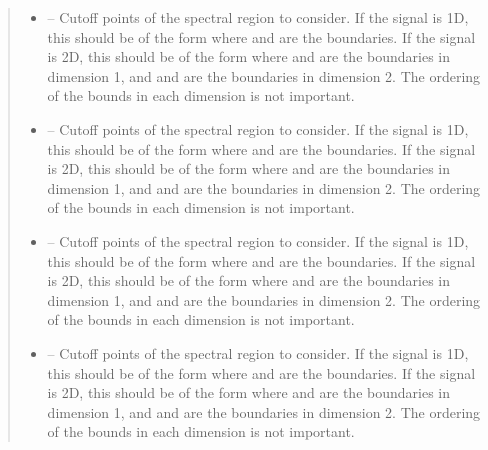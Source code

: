 \documentclass[letterpaper,10pt,english]{sphinxmanual}
\begin{document}
\begin{fulllineitems}
\begin{fulllineitems}
\begin{quote}
\begin{description}
\begin{itemize}
\item {} 
\sphinxAtStartPar
\sphinxstyleliteralstrong{\sphinxupquote{{[}}}\sphinxstyleliteralstrong{\sphinxupquote{{[}}} – Cut\sphinxhyphen{}off points of the spectral region to consider.
If the signal is 1D, this should be of the form \sphinxtitleref{{[}{[}a,b{]}{]}}
where  and  are the boundaries.
If the signal is 2D, this should be of the form
\sphinxtitleref{{[}{[}a,b{]}, {[}c,d{]}{]}} where  and  are the boundaries in
dimension 1, and  and  are the boundaries in
dimension 2. The ordering of the bounds in each dimension is
not important.

\item {} 
\sphinxAtStartPar
{}\sphinxstyleliteralstrong{\sphinxupquote{{]}}} – Cut\sphinxhyphen{}off points of the spectral region to consider.
If the signal is 1D, this should be of the form \sphinxtitleref{{[}{[}a,b{]}{]}}
where  and  are the boundaries.
If the signal is 2D, this should be of the form
\sphinxtitleref{{[}{[}a,b{]}, {[}c,d{]}{]}} where  and  are the boundaries in
dimension 1, and  and  are the boundaries in
dimension 2. The ordering of the bounds in each dimension is
not important.

\item {} 
\sphinxAtStartPar
\sphinxstyleliteralstrong{\sphinxupquote{{[}}} – Cut\sphinxhyphen{}off points of the spectral region to consider.
If the signal is 1D, this should be of the form \sphinxtitleref{{[}{[}a,b{]}{]}}
where  and  are the boundaries.
If the signal is 2D, this should be of the form
\sphinxtitleref{{[}{[}a,b{]}, {[}c,d{]}{]}} where  and  are the boundaries in
dimension 1, and  and  are the boundaries in
dimension 2. The ordering of the bounds in each dimension is
not important.

\item {} 
\sphinxAtStartPar
{}\sphinxstyleliteralstrong{\sphinxupquote{{]}}}\sphinxstyleliteralstrong{\sphinxupquote{{]}}} – Cut\sphinxhyphen{}off points of the spectral region to consider.
If the signal is 1D, this should be of the form \sphinxtitleref{{[}{[}a,b{]}{]}}
where  and  are the boundaries.
If the signal is 2D, this should be of the form
\sphinxtitleref{{[}{[}a,b{]}, {[}c,d{]}{]}} where  and  are the boundaries in
dimension 1, and  and  are the boundaries in
dimension 2. The ordering of the bounds in each dimension is
not important.


\end{itemize}
\end{description}
\end{quote}
\end{fulllineitems}
\end{fulllineitems}
\end{document}
